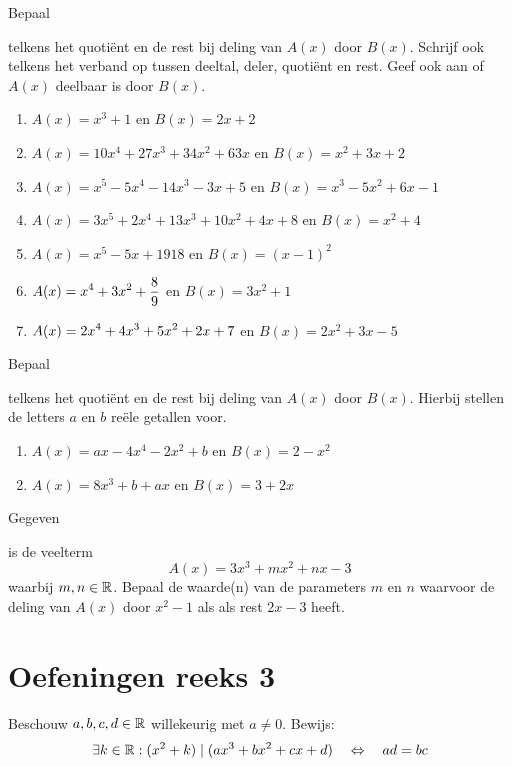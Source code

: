 \documentclass{ximera}
\begin{document}
\begin{exercise} 
\hypertarget{oef2.11}{Bepaal} telkens het quoti\"ent en de rest bij deling van $A(x)$ door $B(x)$. Schrijf ook telkens het verband op tussen deeltal, deler, quoti\"ent en rest. Geef ook aan of $A(x)$ deelbaar is door $B(x)$.
\begin{enumerate}
\item 
$A(x) = x^3+1$ \quad en \quad $B(x) = 2x+2$
\item
$A(x) = 10x^4 + 27x^3 + 34x^2 + 63x$ \quad en \quad $B(x) = x^2 + 3x + 2$ 
\item
$A(x) = x^5 - 5x^4 - 14x^3 - 3x + 5$ \quad en \quad $B(x) = x^3 - 5x^2 + 6x - 1$ 
\item
$A(x) = 3x^5 + 2x^4 + 13x^3 + 10x^2 + 4x + 8$ \quad en \quad $B(x) = x^2 + 4$ 
\item
$A(x) = x^5 - 5x + 1918$ \quad en \quad $B(x) = (x-1)^2$ 
\item
$\displaystyle A(x) = x^4 + 3x^2 + \frac{8}{9}$ en $B(x) = 3x^2 + 1$ 
\item
$\displaystyle A(x) = 2x^4 + 4x^3 + 5x^2 + 2x + 7$ en $B(x) = 2x^2+3x-5$ 
\end{enumerate}
\end{exercise} 

\begin{exercise} 
\hypertarget{oef2.12}{Bepaal} telkens het quoti\"ent en de rest bij deling van $A(x)$ door $B(x)$. Hierbij stellen de letters $a$ en $b$ re\"ele getallen voor. 
\begin{enumerate}
\item
$A(x) = ax - 4x^4 - 2x^2 + b$ en $B(x) = 2-x^2$ 
\item
$A(x) = 8x^3 + b + ax$ \quad en \quad $B(x) = 3+2x$ 
\end{enumerate}
\end{exercise} 

\begin{exercise} 
\hypertarget{oef2.13}{Gegeven} is de veelterm
\[
A(x) = 3x^3 + mx^2 + nx - 3
\]
waarbij $m,n \in \mathbb{R}$. Bepaal de waarde(n) van de parameters $m$ en $n$ waarvoor de deling van $A(x)$ door $x^2-1$ als als rest $2x-3$ heeft. 
\end{exercise} 

\section*{Oefeningen reeks 3}

\begin{exercise} 
Beschouw $a,b,c,d \in \mathbb{R}$ willekeurig met $a \neq 0$. Bewijs:
\[
\exists k \in \mathbb{R}: (x^2 + k) \mid (ax^3 + bx^2 + cx + d) \quad \Leftrightarrow \quad ad = bc
\]
\end{exercise} 
\end{document}
